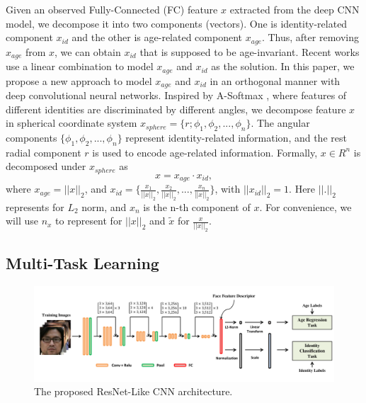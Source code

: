 \documentclass[runningheads]{llncs}
\begin{document}
Given an observed Fully-Connected (FC) feature $x$ extracted from the deep CNN model, we decompose it into two components (vectors). One is identity-related component $x_{id}$ and the other is age-related component $x_{age}$. Thus, after removing $x_{age}$ from $x$, we can obtain $x_{id}$ that is supposed to be age-invariant. 
Recent works \cite{hfa,LFCNN,AECNN} use a linear combination to model $x_{age}$ and $x_{id}$ as the solution. In this paper, we propose a new approach to model $x_{age}$ and $x_{id}$ in an orthogonal manner with deep convolutional neural networks. Inspired by A-Softmax \cite{sphereface}, where features of different identities are discriminated by different angles, we decompose feature $x$ in spherical coordinate system $x_{sphere} = \{r; \phi_1, \phi_2, ..., \phi_{n} \}$. The angular components $\{\phi_1, \phi_2, ..., \phi_{n}\}$ represent identity-related information, and the rest radial component $r$ is used to encode age-related information. Formally, $x \in R^{n}$ is decomposed under $x_{sphere}$ as
\begin{equation}\label{2}
x = x_{age} \cdot x_{id},
\end{equation}
where $x_{age}=||x||_2$, and $x_{id}=\{\frac{x_1}{||x||_2}, \frac{x_2}{||x||_2}, ..., \frac{x_n}{||x||_2}\}$, with $||x_{id}||_2=1$. Here $||.||_2$ represents for $L_2$ norm, and $x_n$ is the n-th component of $x$. For convenience, we will use $n_x$ to represent for $||x||_2$ and $\tilde x$ for $\frac{x}{||x||_2}$.

\subsection{Multi-Task Learning}

\begin{figure}[t]
\begin{center}
   \includegraphics[width=1 \linewidth, keepaspectratio]{figures/fig2.pdf}
\end{center}
   \caption{The proposed ResNet-Like CNN architecture.}
\label{fig::2}
\end{figure}
\end{document}
